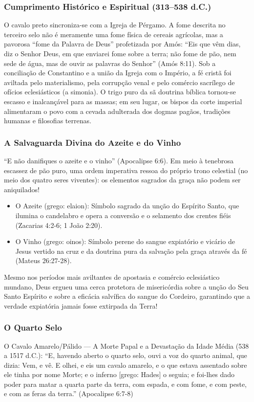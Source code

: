 \subsubsection*{Cumprimento Histórico e Espiritual (313–538 d.C.)}
O cavalo preto sincroniza-se com a Igreja de Pérgamo. A fome descrita no terceiro selo não é meramente uma fome física de cereais agrícolas, mas a pavorosa ``fome da Palavra de Deus'' profetizada por Amós: ``Eis que vêm dias, diz o Senhor Deus, em que enviarei fome sobre a terra; não fome de pão, nem sede de água, mas de ouvir as palavras do Senhor'' (Amós 8:11).
Sob a conciliação de Constantino e a união da Igreja com o Império, a fé cristã foi aviltada pelo materialismo, pela corrupção venal e pelo comércio sacrílego de ofícios eclesiásticos (a simonia). O trigo puro da sã doutrina bíblica tornou-se escasso e inalcançável para as massas; em seu lugar, os bispos da corte imperial alimentaram o povo com a cevada adulterada dos dogmas pagãos, tradições humanas e filosofias terrenas.


\subsubsection*{A Salvaguarda Divina do Azeite e do Vinho}
``E não danifiques o azeite e o vinho'' (Apocalipse 6:6).
Em meio à tenebrosa escassez de pão puro, uma ordem imperativa ressoa do próprio trono celestial (no meio dos quatro seres viventes): os elementos sagrados da graça não podem ser aniquilados!
\begin{itemize}
  \item O Azeite (grego: elaion): Símbolo sagrado da unção do Espírito Santo, que ilumina o candelabro e opera a conversão e o selamento dos crentes fiéis (Zacarias 4:2-6; 1 João 2:20).
  \item O Vinho (grego: oinos): Símbolo perene do sangue expiatório e vicário de Jesus vertido na cruz e da doutrina pura da salvação pela graça através da fé (Mateus 26:27-28).
\end{itemize}

Mesmo nos períodos mais aviltantes de apostasia e comércio eclesiástico mundano, Deus ergueu uma cerca protetora de misericórdia sobre a unção do Seu Santo Espírito e sobre a eficácia salvífica do sangue do Cordeiro, garantindo que a verdade expiatória jamais fosse extirpada da Terra!


\subsubsection*{O Quarto Selo}
O Cavalo Amarelo/Pálido — A Morte Papal e a Devastação da Idade Média (538 a 1517 d.C.):
``E, havendo aberto o quarto selo, ouvi a voz do quarto animal, que dizia: Vem, e vê. E olhei, e eis um cavalo amarelo, e o que estava assentado sobre ele tinha por nome Morte; e o inferno [grego: Hades] o seguia; e foi-lhes dado poder para matar a quarta parte da terra, com espada, e com fome, e com peste, e com as feras da terra.'' (Apocalipse 6:7-8)


